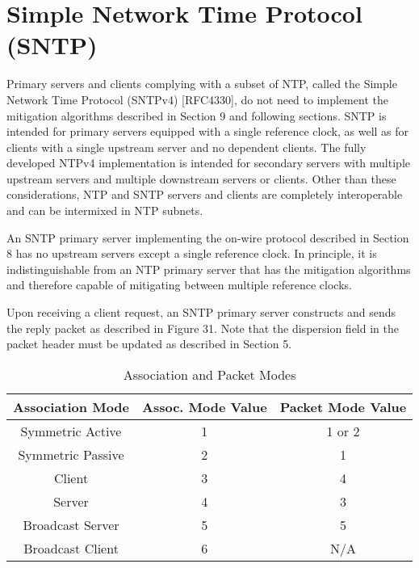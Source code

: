 \chapter{Simple Network Time Protocol (SNTP)}

Primary servers and clients complying with a subset of NTP, called
the Simple Network Time Protocol (SNTPv4) [RFC4330], do not need to
implement the mitigation algorithms described in Section 9 and
following sections.  SNTP is intended for primary servers equipped
with a single reference clock, as well as for clients with a single
upstream server and no dependent clients.  The fully developed NTPv4
implementation is intended for secondary servers with multiple
upstream servers and multiple downstream servers or clients.  Other
than these considerations, NTP and SNTP servers and clients are
completely interoperable and can be intermixed in NTP subnets.

An SNTP primary server implementing the on-wire protocol described in
Section 8 has no upstream servers except a single reference clock.
In principle, it is indistinguishable from an NTP primary server that
has the mitigation algorithms and therefore capable of mitigating
between multiple reference clocks.

Upon receiving a client request, an SNTP primary server constructs
and sends the reply packet as described in Figure 31.  Note that the
dispersion field in the packet header must be updated as described in
Section 5.

\begin{table}[htb]
\center
\begin{tabular}{c | c | c}
Association Mode & Assoc. Mode Value & Packet Mode Value \\
\hline
\hline
Symmetric Active & 1 & 1 or 2 \\
Symmetric Passive & 2 & 1 \\
Client & 3 & 4 \\
Server & 4 & 3 \\
Broadcast Server & 5 & 5 \\
Broadcast Client & 6 & N/A \\
\hline
\end{tabular}
\label{association_and_packet_modes}
\caption{Association and Packet Modes}
\end{table}

